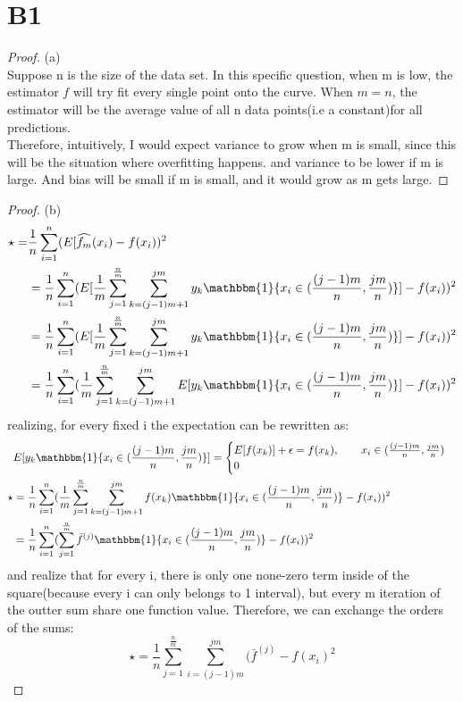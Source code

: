 \documentclass[12pt]{article}
\begin{document}
\section*{B1}
\begin{proof}
        (a)\\
        Suppose n is the size of the data set. In this specific question, when m is low, the estimator $f$ will try fit every single point onto the curve. When $m=n$, the estimator will be the average value of all n data points(i.e a constant)for all predictions. \\
        Therefore, intuitively, I would expect variance to grow when m is small, since this will be the situation where overfitting happens. and variance to be lower if m is large. And bias will be small if m is small, and it would grow as m gets large. 
\end{proof}
\begin{proof}
        (b)\\
        \[
\begin{aligned}
      \star =  & \frac{1}{n} \sum_{i=1}^{n} (E[\widehat{f_m}(x_i) - f(x_i))^2\\
       &=  \frac{1}{n} \sum_{i=1}^{n} (E[\frac{1}{m}\sum^{\frac{n}{m}}_{j=1} \sum_{k=(j-1)m+1}^{jm} y_k \mathbbm{1}\{x_i \in (\frac{(j-1)m}{n}, \frac{jm}{n})\} ]- f(x_i))^2\\
       &=  \frac{1}{n} \sum_{i=1}^{n} (E[\frac{1}{m}\sum^{\frac{n}{m}}_{j=1} \sum_{k=(j-1)m+1}^{jm} y_k \mathbbm{1}\{x_i \in (\frac{(j-1)m}{n}, \frac{jm}{n})\} ]- f(x_i))^2\\
       &=  \frac{1}{n} \sum_{i=1}^{n} (\frac{1}{m}\sum^{\frac{n}{m}}_{j=1} \sum_{k=(j-1)m+1}^{jm}E[ y_k \mathbbm{1}\{x_i \in (\frac{(j-1)m}{n}, \frac{jm}{n})\} ]- f(x_i))^2 \\
\end{aligned}
        \]
        realizing, for every fixed i the expectation can be rewritten as: 
\[
\begin{aligned}
        & E[ y_k \mathbbm{1}\{x_i \in (\frac{(j-1)m}{n}, \frac{jm}{n})\} ] = \begin{cases}
                E[f(x_k)] + \epsilon  = f(x_k) , \qquad x_i \in (\frac{(j-1)m}{n}, \frac{jm}{n})\\ 
                0
        \end{cases}\\
        \star &=  \frac{1}{n} \sum_{i=1}^{n} (\frac{1}{m}\sum^{\frac{n}{m}}_{j=1} \sum_{k=(j-1)m+1}^{jm}f(x_k) \mathbbm{1}\{x_i \in (\frac{(j-1)m}{n}, \frac{jm}{n})\}- f(x_i))^2 \\
              &=  \frac{1}{n} \sum_{i=1}^{n} (\sum_{j=1}^{\frac{n}{m}} \bar{f}^{(j)}  \mathbbm{1}\{x_i \in (\frac{(j-1)m}{n}, \frac{jm}{n})\}- f(x_i))^2 \\
\end{aligned}
\]
and realize that for every i, there is only one none-zero term inside of the square(because every i can only belongs to 1 interval), but every m iteration of the outter sum share one function value. Therefore, we can exchange the orders of the sums: \\
$$\star  =  \frac{1}{n} \sum_{j=1}^{\frac{n}{m}} \sum_{i= (j-1)m}^{jm} (\bar{f}^{(j)} - f(x_i)^2 $$
\end{proof}
\end{document}
